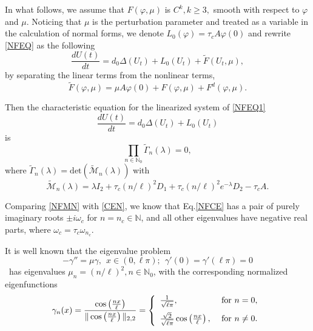 \documentclass[11pt]{article}
\theoremstyle{definition}
\theoremstyle{remark}
\numberwithin{equation}{section}
\begin{document}
  In what follows, we assume that  $F(\varphi, \mu)$ is $C^k, k\geq 3,$ smooth with respect to $\varphi$ and $\mu$.
  Noticing that $\mu$ is the perturbation parameter and treated as a variable in the calculation of normal forms,  we denote
  $L_0(\varphi)=\tau_cA\varphi(0)$
 and rewrite  \eqref{NFEQ}   as  the following
  \begin{equation}\label{NFEQ1}
\frac{dU(t)}{dt}=d_0\Delta (U_t)+L_0(U_t)+\widetilde{F}(U_{t},  \mu),
\end{equation}
by separating the linear terms from the nonlinear terms,
\begin{equation}
\label{NLTERM}
\widetilde{F}(\varphi, \mu)=\mu A\varphi(0)+F(\varphi, \mu)+F^d(\varphi, \mu).
\end{equation}

Then the characteristic equation for the linearized system of \eqref{NFEQ1}
 \begin{equation}\label{LNFEQ1}
\frac{dU(t)}{dt}=d_0\Delta (U_t)+L_0(U_t)
\end{equation}
is
\begin{equation}
\label{NFCE}
\prod\limits_{n\in \mathbb{N}_0} \widetilde{\Gamma}_n(\lambda)=0,
\end{equation}
where  $\widetilde{\Gamma}_n(\lambda)=\mathrm{det}\left(\widetilde{\mathcal{M}}_n(\lambda)\right)$ with
\begin{equation}
\label{NFMN}
\widetilde{\mathcal{M}}_n(\lambda)=\lambda I_2+\tau_c(n/\ell)^2D_1+\tau_c(n/\ell)^2e^{-\lambda}D_2-\tau_cA.
\end{equation}

Comparing   \eqref{NFMN} with \eqref{CEN}, we know that
Eq.\eqref{NFCE}  has a pair  of purely imaginary  roots
$\pm i\omega_c$   for $n=n_c\in\mathbb{N}$,  and  all other eigenvalues  have negative real parts, where
$\omega_c=\tau_c\omega_{n_c}$.

 It is well known that the eigenvalue problem
 $$
-\gamma''=\mu \gamma,~~x\in(0, \ell\pi);~~\gamma'(0)=\gamma'(\ell\pi)=0
$$
\ has eigenvalues $\mu_{n}=(n/\ell)^{2}, n\in \mathbb{N}_0 $,
with the corresponding normalized eigenfunctions
$$\gamma_n(x)=\frac{\cos\left(\frac{nx}{\ell}\right)}{\|\cos\left(\frac{nx}{\ell}\right)\|_{2,2}}=\left\{
\begin{array}{ll}
  \frac{1}{\sqrt{\ell \pi}}, & ~\mathrm{for}~n=0,\vspace{0.2cm} \\
  \frac{\sqrt{2}}{\sqrt{\ell \pi}}\cos\left(\frac{nx}{\ell}\right), & ~\mathrm{for}~n\neq 0.
\end{array}
\right.$$
\end{document}
